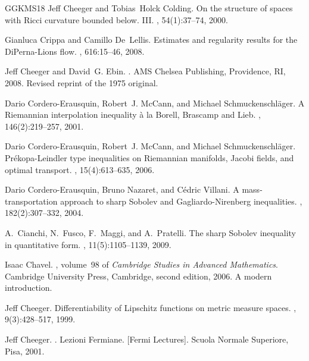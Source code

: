 \documentclass[11pt]{article}
\numberwithin{equation}{section}
\begin{document}
{\begin{thebibliography}{GGKMS18}
Jeff Cheeger and Tobias~Holck Colding.
\newblock On the structure of spaces with {R}icci curvature bounded below.
  {III}.
, 54(1):37--74, 2000.

Gianluca Crippa and Camillo De~Lellis.
\newblock Estimates and regularity results for the {D}i{P}erna-{L}ions flow.
, 616:15--46, 2008.

Jeff Cheeger and David~G. Ebin.
.
\newblock AMS Chelsea Publishing, Providence, RI, 2008.
\newblock Revised reprint of the 1975 original.

Dario Cordero-Erausquin, Robert~J. McCann, and Michael Schmuckenschl\"{a}ger.
\newblock A {R}iemannian interpolation inequality \`a la {B}orell, {B}rascamp
  and {L}ieb.
, 146(2):219--257, 2001.

Dario Cordero-Erausquin, Robert~J. McCann, and Michael Schmuckenschl\"{a}ger.
\newblock Pr\'{e}kopa-{L}eindler type inequalities on {R}iemannian manifolds,
  {J}acobi fields, and optimal transport.
, 15(4):613--635, 2006.

Dario Cordero-Erausquin, Bruno Nazaret, and C{\'e}dric Villani.
\newblock A mass-transportation approach to sharp {S}obolev and
  {G}agliardo-{N}irenberg inequalities.
, 182(2):307--332, 2004.

A.~Cianchi, N.~Fusco, F.~Maggi, and A.~Pratelli.
\newblock The sharp {S}obolev inequality in quantitative form.
, 11(5):1105--1139, 2009.

Isaac Chavel.
, volume~98 of {\em Cambridge Studies in
  Advanced Mathematics}.
\newblock Cambridge University Press, Cambridge, second edition, 2006.
\newblock A modern introduction.

Jeff Cheeger.
\newblock Differentiability of {L}ipschitz functions on metric measure spaces.
, 9(3):428--517, 1999.

Jeff Cheeger.
.
\newblock Lezioni Fermiane. [Fermi Lectures]. Scuola Normale Superiore, Pisa,
  2001.


\end{thebibliography}}
\end{document}

